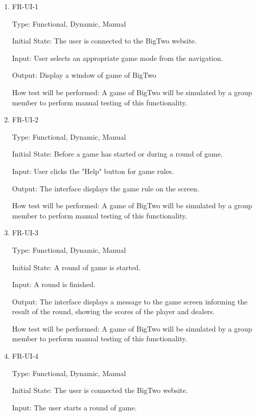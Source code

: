 \documentclass[12pt, titlepage]{article}
\begin{document}
\begin{enumerate}

\item{FR-UI-1\\}

Type: Functional, Dynamic, Manual
					
Initial State: The user is connected to the BigTwo website.
					
Input: User selects an appropriate game mode from the navigation.
					
Output: Display a window of game of BigTwo
					
How test will be performed: A game of BigTwo will be simulated by a group member to perform manual testing of this functionality.
					
\item{FR-UI-2\\}

Type: Functional, Dynamic, Manual
					
Initial State: Before a game has started or during a round of game.
					
Input: User clicks the "Help" button for game rules.
					
Output: The interface displays the game rule on the screen.
					
How test will be performed: A game of BigTwo will be simulated by a group member to perform manual testing of this functionality.

\item{FR-UI-3\\}

Type: Functional, Dynamic, Manual
					
Initial State: A round of game is started.
					
Input: A round is finished.
					
Output: The interface displays a message to the game screen informing the result of the round, showing the scores of the player and dealers.
					
How test will be performed: A game of BigTwo will be simulated by a group member to perform manual testing of this functionality.

\item{FR-UI-4\\}

Type: Functional, Dynamic, Manual
					
Initial State: The user is connected the BigTwo website.
					
Input: The user starts a round of game.
					

\end{enumerate}
\end{document}

